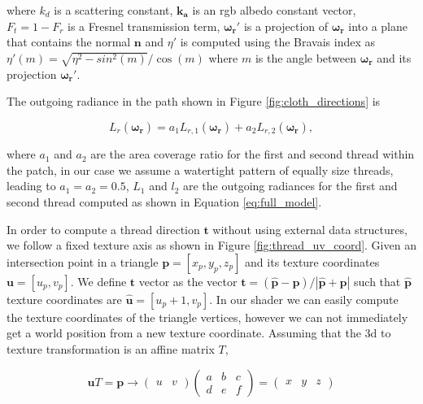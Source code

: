 \documentclass[12pt]{article}
\newcommand{\omegar}{\boldsymbol{\omega_r}}
\newcommand{\tb}{\mathbf{t}}
\begin{document}
where $k_d$ is a scattering constant, $\mathbf{k_a}$ is an rgb albedo constant vector, $F_t = 1 - F_r$ is a Fresnel transmission term, $\omegar'$ is a projection of $\omegar$ into a plane that contains the normal $\mathbf{n}$ and $\eta'$ is computed using the Bravais index \cite{Marschner2003} as $\eta'(m) = \sqrt{\eta^2 - sin^2(m)}  / \cos(m)$ where $m$ is the angle between $\omegar$ and its projection $\omegar'$.

The outgoing radiance in the path shown in Figure \ref{fig:cloth_directions} is

\begin{equation}
L_r(\omegar) = a_1 L_{r,1}(\omegar) + a_2 L_{r,2}(\omegar),
\end{equation}

where $a_1$ and $a_2$ are the area coverage ratio for the first and second thread within the patch, in our case we assume a watertight pattern of equally size threads, leading to $a_1 = a_2 = 0.5$, $L_1$ and $l_2$ are the outgoing radiances for the first and second thread computed as shown in Equation \ref{eq:full_model}.

In order to compute a thread direction $\tb$ without using external data structures, we follow a fixed texture axis as shown in Figure \ref{fig:thread_uv_coord}.
Given an intersection point in a triangle $\mathbf{p} = \left[ x_p, y_p,z_p \right]$ and its texture coordinates $\mathbf{u} = \left[ u_p, v_p \right]$.
We define $\tb$ vector as the vector $\tb = (\hat{\mathbf{p}} - \mathbf{p})/ \left|\hat{\mathbf{p}} + \mathbf{p} \right|$ such that $\hat{\mathbf{p}}$ texture coordinates are $\hat{\mathbf{u}} = \left[ u_p + 1, v_p \right]$.
In our shader we can easily compute the texture coordinates of the triangle vertices, however we can not immediately get a world position from a new texture coordinate.
Assuming that the 3d to texture transformation is an affine matrix $T$,

\begin{equation}
\mathbf{u} T = \mathbf{p} \rightarrow
\begin{pmatrix}
u & v
\end{pmatrix}
\begin{pmatrix}
a & b & c \\
d & e & f
\end{pmatrix} =
\begin{pmatrix}
x & y & z
\end{pmatrix}
\label{eq:uv_to_3d}
\end{equation}
\end{document}
